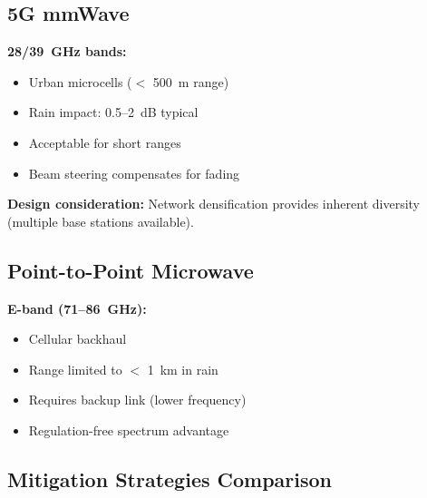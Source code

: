 \begin{enumerate}
\subsection{5G mmWave}

\textbf{28/39~GHz bands:}
\begin{itemize}
\item Urban microcells ($<$ 500~m range)
\item Rain impact: 0.5--2~dB typical
\item Acceptable for short ranges
\item Beam steering compensates for fading
\end{itemize}

\textbf{Design consideration:} Network densification provides inherent diversity (multiple base stations available).

\subsection{Point-to-Point Microwave}

\textbf{E-band (71--86~GHz):}
\begin{itemize}
\item Cellular backhaul
\item Range limited to $<$ 1~km in rain
\item Requires backup link (lower frequency)
\item Regulation-free spectrum advantage
\end{itemize}

\subsection{Mitigation Strategies Comparison}

\begin{center}
\end{center}
\end{enumerate}

